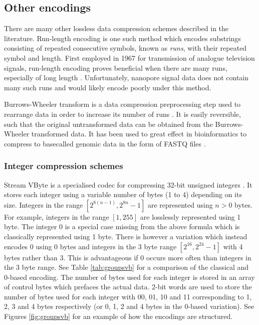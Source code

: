 \subsection{Other encodings}
\label{sec:data-other}

There are many other lossless data compression schemes described in the literature. Run-length encoding is one such method which encodes substrings consisting of repeated consecutive symbols, known as \textit{runs}, with their repeated symbol and length. First employed in 1967 for transmission of analogue television signals, run-length encoding proves beneficial when there are many runs, especially of long length \cite{rle}. Unfortunately, nanopore signal data does not contain many such runs and would likely encode poorly under this method.

Burrows-Wheeler transform is a data compression preprocessing step used to rearrange data in order to increase its number of runs \cite{bwt}. It is easily reversible, such that the original untransformed data can be obtained from the Burrows-Wheeler transformed data. It has been used to great effect in bioinformatics to compress to basecalled genomic data in the form of FASTQ files \cite{bwt-genomic}.

\subsubsection{Integer compression schemes}
\label{sec:integer-comp}

Stream VByte is a specialised codec for compressing 32-bit unsigned integers \cite{svb}. It stores each integer using a variable number of bytes (1 to 4) depending on its size. Integers in the range $[2^{8(n-1)},2^{8n}-1]$ are represented using $n>0$ bytes. For example, integers in the range $[1,255]$ are losslessly represented using 1 byte. The integer 0 is a special case missing from the above formula which is classically represented using 1 byte. There is however a variation which instead encodes 0 using 0 bytes and integers in the 3 byte range $[2^{16},2^{24}-1]$ with 4 bytes rather than 3. This is advantageous if 0 occurs more often than integers in the 3 byte range. See Table \ref{tab:groupsvb} for a comparison of the classical and 0-based encoding. The number of bytes used for each integer is stored in an array of control bytes which prefaces the actual data. 2-bit words are used to store the number of bytes used for each integer with 00, 01, 10 and 11 corresponding to 1, 2, 3 and 4 bytes respectively (or 0, 1, 2 and 4 bytes in the 0-based variation). See Figures \ref{fig:groupsvb} for an example of how the encodings are structured.


